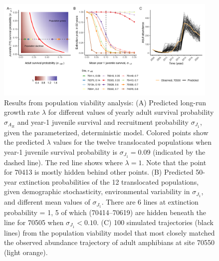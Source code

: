 \documentclass[9pt,twocolumn,twoside,lineno]{pnas-new}
\begin{document}
\begin{figure}

{\centering \includegraphics[width=0.95\textwidth]{figures/pop_viability_figures_for_manuscript.jpg}

}

\caption{\label{fig-viability}Results from population viability
analysis: (A) Predicted long-run growth rate \(\lambda\) for different
values of yearly adult survival probability \(\sigma_{A_R}\) and year-1
juvenile survival and recruitment probability \(\sigma_{J_1}\), given
the parameterized, deterministic model. Colored points show the
predicted \(\lambda\) values for the twelve translocated populations
when year-1 juvenile survival probability is \(\sigma_{J_1} = 0.09\)
(indicated by the dashed line). The red line shows where
\(\lambda = 1\). Note that the point for 70413 is mostly hidden behind
other points. (B) Predicted 50-year extinction probabilities of the 12
translocated populations, given demographic stochasticity, environmental
variability in \(\sigma_{J_1}\), and different mean values of
\(\sigma_{J_1}\). There are 6 lines at extinction probability = 1, 5 of
which (70414--70619) are hidden beneath the line for 70505 when
\(\sigma_{J_1} < 0.10\). (C) 100 simulated trajectories (black lines)
from the population viability model that most closely matched the
observed abundance trajectory of adult amphibians at site 70550 (light
orange).}

\end{figure}

\newpage
\end{document}
